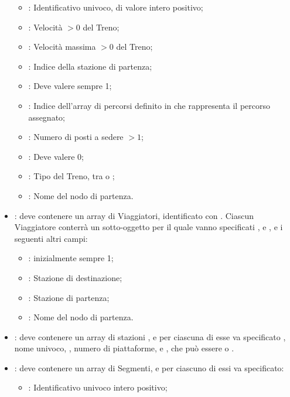 \begin{itemize}
			\begin{itemize}
				\item {} : Identificativo univoco, di valore intero positivo;
				\item {}: Velocità $> 0$ del Treno;
				\item {}: Velocità massima $> 0$ del Treno;
				\item {}: Indice della stazione di partenza;
				\item {}: Deve valere sempre 1;
				\item {}: Indice dell'array di percorsi definito in  che rappresenta il percorso assegnato;
				\item {}: Numero di posti a sedere $> 1$;
				\item {}: Deve valere 0;
				\item {}: Tipo del Treno, tra  o ;
				\item {}: Nome del nodo di partenza.
			\end{itemize}
		\item {}: deve contenere un array di Viaggiatori, identificato con . Ciascun Viaggiatore conterrà un sotto-oggetto  per il quale vanno specificati ,  e , e i seguenti altri campi:
			\begin{itemize}
				\item {}: inizialmente sempre 1;
				\item {}: Stazione di destinazione;
				\item {}: Stazione di partenza;
				\item {}: Nome del nodo di partenza.
			\end{itemize}
		\item {}: deve contenere un array di stazioni , e per ciascuna di esse va specificato , nome univoco, , numero di piattaforme, e , che può essere  o . 
		\item {}: deve contenere un array  di Segmenti, e per ciascuno di essi va specificato:
			\begin{itemize}
				\item {}: Identificativo univoco intero positivo;

\end{itemize}
\end{itemize}
